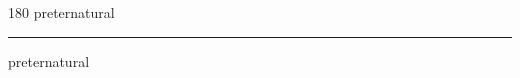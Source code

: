 
\begin{frame}
\begin{center}
\begin{turn}{180}
{\fontsize{2.5cm}{1em}\selectfont preternatural}
\end{turn}
\vspace{1em}\par  
\hrule
\vspace{1em}\par  
{\fontsize{2.5cm}{1em}\selectfont preternatural}
\end{center}
\end{frame}
